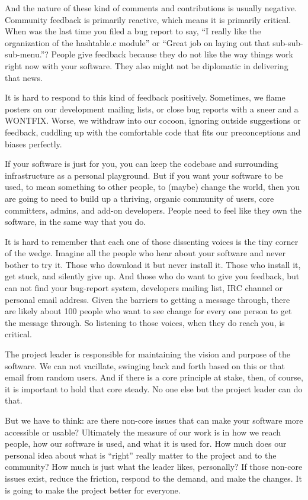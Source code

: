 And the nature of these kind of comments and contributions is usually negative.
Community feedback is primarily reactive, which means it is primarily critical.
When was the last time you filed a bug report to say, ``I really like the
organization of the hashtable.c module'' or ``Great job on laying out that
sub-sub-sub-menu.''? People give feedback because they do not like the way things
work right now with your software. They also might not be diplomatic in
delivering that news.

It is hard to respond to this kind of feedback positively. Sometimes, we flame
posters on our development mailing lists, or close bug reports with a sneer and
a WONTFIX. Worse, we withdraw into our cocoon, ignoring outside suggestions or
feedback, cuddling up with the comfortable code that fits our preconceptions and
biases perfectly.

If your software is just for you, you can keep the codebase and surrounding
infrastructure as a personal playground. But if you want your software to be
used, to mean something to other people, to (maybe) change the world, then
you are going to need to build up a thriving, organic community of users, core
committers, admins, and add-on developers. People need to feel like they own the
software, in the same way that you do.

It is hard to remember that each one of those dissenting voices is the tiny
corner of the wedge. Imagine all the people who hear about your software and
never bother to try it. Those who download it but never install it. Those who
install it, get stuck, and silently give up. And those who do want to give you
feedback, but can not find your bug-report system, developers mailing list, IRC
channel or personal email address. Given the barriers to getting a message
through, there are likely about 100 people who want to see change for
every one person to get the message through. So listening to those voices, when
they do reach you, is critical.

The project leader is responsible for maintaining the vision and purpose of the
software. We can not vacillate, swinging back and forth based on this or that
email from random users. And if there is a core principle at stake, then, of
course, it is important to hold that core steady. No one else but the project
leader can do that.

But we have to think: are there non-core issues that can make your software more
accessible or usable?
Ultimately the measure of our work is in how we reach people, how our software
is used, and what it is used for. How much does our personal idea about what is
``right'' really matter to the project and to the community? How much is just what
the leader likes, personally? If those non-core issues exist, reduce the
friction, respond to the demand, and make the changes. It is going to make the
project better for everyone.

